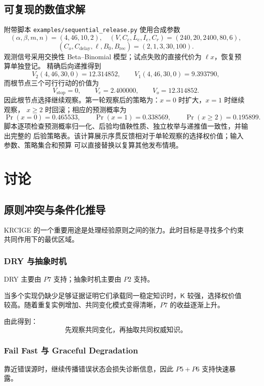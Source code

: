 \documentclass[11pt,a4paper]{ctexart}
\numberwithin{equation}{section}
\theoremstyle{definition}
\theoremstyle{plain}
\newcommand{\Know}{\mathsf{K}}
\begin{document}
\subsection{可复现的数值求解}

附带脚本 \texttt{examples/sequential\_release.py} 使用合成参数
\[
(\alpha,\beta,m,n)=(4,46,10,2),
\quad
(V,C_e,L_e,I_e,C_r)=(240,20,2400,80,6),
\]
\[
(C_o,C_{\mathrm{delay}},\ell,B_0,B_{\mathrm{rec}})
=(2,1,3,30,100).
\]
观测信号采用交换性 Beta--Binomial 模型；试点失败的直接代价为 $\ell x$，恢复预算单独登记。
精确后向递推得到
\[
V_2(4,46,30,0)=12.314852,
\qquad
V_1(4,46,30,0)=9.393790,
\]
而根节点三个可行行动的价值为
\[
V_{\mathrm{stop}}=0,\qquad V_e=2.400000,\qquad V_o=12.314852.
\]
因此根节点选择继续观察。第一轮观察后的策略为：$x=0$ 时扩大，$x=1$ 时继续观察，
$x\ge2$ 时回滚；相应的预测概率为
\[
\Pr(x=0)=0.465533,\qquad
\Pr(x=1)=0.338569,\qquad
\Pr(x\ge2)=0.195899.
\]
脚本逐项检查预测概率归一化、后验均值鞅性质、独立枚举与递推值一致性，并输出完整的
后验策略表。该计算展示序贯反馈相对于单轮观察的选择权价值；输入参数、策略集合和预算
可以直接替换以复算其他发布情境。

\section{讨论}
\subsection{原则冲突与条件化推导}

KRCIGE 的一个重要用途是处理经验原则之间的张力。此时目标是寻找多个约束共同作用下的最优区域。

\subsubsection{DRY 与抽象时机}

DRY 主要由 $P7$ 支持；抽象时机主要由 $P2$ 支持。

当多个实现仍缺少足够证据证明它们承载同一稳定知识时，$\Know$ 较强，选择权价值较高。随着重复实例增加、共同变化模式变得清晰，$P7$ 的收益逐渐上升。

由此得到：
\[
\boxed{
\text{先观察共同变化，再抽取共同权威知识。}
}
\]

\subsubsection{Fail Fast 与 Graceful Degradation}

靠近错误源时，继续传播错误状态会损失诊断信息，因此 $P5+P6$ 支持快速暴露。
\end{document}
